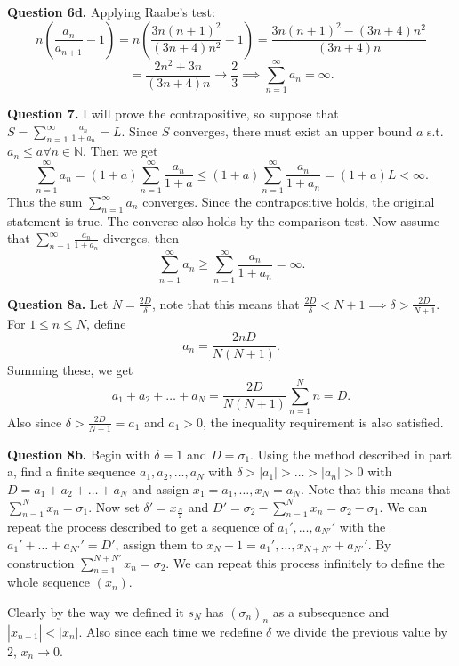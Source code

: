 \documentclass[letterpaper, reqno,11pt]{article}
\begin{document}
{\medskip\noindent\bf Question 6d.} Applying Raabe's test:
\[
    n\left( \frac{a_n}{a_{n+1}}-1 \right) =n\left( \frac{3n(n+1)^2}{\left( 3n+4 \right) n^2}-1 \right)=\frac{3n(n+1)^2-(3n+4)n^2}{(3n+4)n}
\]
\[
=\frac{2n^2+3n}{(3n+4)n}\to \frac{2}{3}\implies \sum_{n=1}^{\infty}a_n=\infty
.\]

\newpage\phantom{blabla}
\newpage

{\medskip\noindent\bf Question 7.} I will prove the contrapositive, so suppose that $S=\sum_{n=1}^{\infty}\frac{a_n}{1+a_n}=L$. Since $S$ converges, there must exist an upper bound $a$ s.t. $a_n\leq a\forall n\in \mathbb{N}$. Then we get
\[
\sum_{n=1}^{\infty}a_n=(1+a)\sum_{n=1}^{\infty}\frac{a_n}{1+a}\leq (1+a)\sum_{n=1}^{\infty} \frac{a_n}{1+a_n}=(1+a)L<\infty
.\]
Thus the sum $\sum_{n=1}^{\infty}a_n$ converges. Since the contrapositive holds, the original statement is true. The converse also holds by the comparison test. Now assume that $\sum_{n=1}^{\infty} \frac{a_n}{1+a_n}$ diverges, then
\[
\sum_{n=1}^{\infty}a_n\geq \sum_{n=1}^{\infty} \frac{a_n}{1+a_n}=\infty
.\]

\newpage\phantom{blabla}
\newpage

{\medskip\noindent\bf Question 8a.} Let $N=\frac{2D}{\delta}$, note that this means that $\frac{2D}{\delta}<N+1\implies \delta> \frac{2D}{N+1}$. For $1\leq n\leq N$, define
\[
a_{n}=\frac{2nD}{N(N+1)}
.\]
Summing these, we get
\[
a_1+a_2+\ldots+a_N= \frac{2D}{N(N+1)}\sum_{n=1}^{N}n=D
.\]
Also since $\delta>\frac{2D}{N+1}=a_1$ and $a_1>0$, the inequality requirement is also satisfied.

{\medskip\noindent\bf Question 8b.} Begin with $\delta=1$ and $D=\sigma_1$. Using the method described in part a, find a finite sequence $a_1,a_2,\ldots,a_N$ with $\delta>|a_1|>\ldots>|a_n|>0$ with $D=a_1+a_2+\ldots+a_N$ and assign $x_1=a_1,\ldots,x_N=a_N$. Note that this means that $\sum_{n=1}^{N}x_n=\sigma_1$. Now set $\delta'=x_\frac{N}{2}$ and $D'=\sigma_2-\sum_{n=1}^{N}x_n=\sigma_2-\sigma_1$. We can repeat the process described to get a sequence of $a_1',\ldots,a_{N'}'$ with the $a_1'+\ldots+a_{N'}'=D'$, assign them to $x_N+1=a_1',\ldots,x_{N+N'}+a_{N'}'$. By construction $\sum_{n=1}^{N+N'}x_n=\sigma_2$. We can repeat this process infinitely to define the whole sequence $(x_n)$.

Clearly by the way we defined it $s_N$ has $(\sigma_n)_n$ as a subsequence and $|x_{n+1}|<\left| x_n \right| $. Also since each time we redefine $\delta$ we divide the previous value by $2$, $x_{n}\to 0$.

\newpage\phantom{blabla}
\newpage
\end{document}

